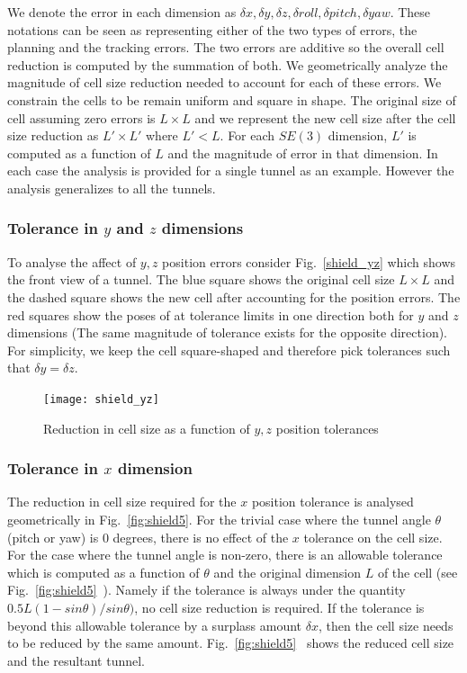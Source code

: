 \documentclass[a4paper]{report}
\begin{document}
We denote the error in each dimension as $\delta x,\delta y, \delta z,\delta roll,\delta pitch,\delta yaw$. These notations can be seen as representing either of the two types of errors, the planning and the tracking errors. The two errors are additive so the overall cell reduction is computed by the summation of both.
%
We geometrically analyze the magnitude of cell size reduction needed to account for each of these errors. We constrain the cells to be remain uniform and square in shape. The original size of cell assuming zero errors is $L \times L$ and we represent the new cell size after the cell size reduction as $L' \times L'$ where $L' < L$. For each $SE(3)$ dimension, $L'$ is computed as a function of $L$ and the magnitude of error in that dimension. In each case the analysis is provided for a single tunnel as an example. However the analysis generalizes to all the tunnels.
%

\subsubsection{Tolerance in $y$ and $z$ dimensions}
To analyse the affect of $y,z$ position errors consider Fig.~\ref{shield_yz} which shows the front view of a tunnel. The blue square shows the original cell size $L \times L$ and the dashed square shows the new cell after accounting for the position errors. The red squares show the poses of \calS at tolerance limits in one direction both for $y$ and $z$ dimensions (The same magnitude of tolerance exists for the opposite direction). For simplicity, we keep the cell square-shaped and therefore pick tolerances such that $\delta y = \delta z$.
\begin{figure}[ht]
\centering
\texttt{[image: shield\_yz]}
\caption{Reduction in cell size as a function of $y,z$ position tolerances}
\label{fig:shield_yz}
\end{figure}

\subsubsection{Tolerance in $x$ dimension}
The reduction in cell size required for the $x$ position tolerance is analysed geometrically in Fig.~\ref{fig:shield5}. For the trivial case where the tunnel angle $\theta$ (pitch or yaw) is 0 degrees, there is no effect of the $x$ tolerance on the cell size. 
For the case where the tunnel angle is non-zero, there is an allowable tolerance which is computed as a function of $\theta$ and the original dimension $L$ of the cell (see Fig.~\ref{fig:shield5}~). Namely if the tolerance is always under the quantity $0.5L(1 -sin \theta) / sin \theta)$, no cell size reduction is required.
If the tolerance is beyond this allowable tolerance by a surplass amount $\delta x$, then the cell size needs to be reduced by the same amount. Fig.~\ref{fig:shield5}~ shows the reduced cell size and the resultant tunnel.
\end{document}
